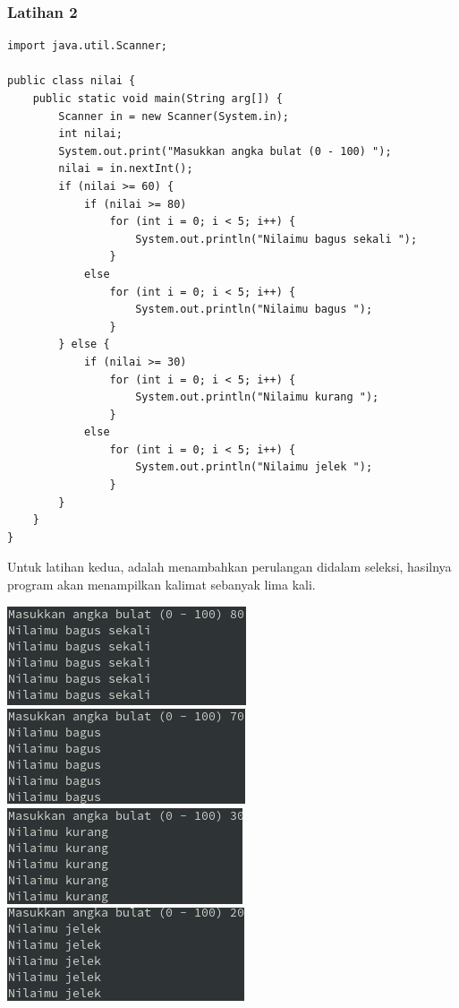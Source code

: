 \documentclass[a4paper,12pt]{article}
\begin{document}
\subsubsection{Latihan 2}
\begin{lstlisting}
import java.util.Scanner;

public class nilai {
    public static void main(String arg[]) {
        Scanner in = new Scanner(System.in);
        int nilai;
        System.out.print("Masukkan angka bulat (0 - 100) ");
        nilai = in.nextInt();
        if (nilai >= 60) {
            if (nilai >= 80)
                for (int i = 0; i < 5; i++) {
                    System.out.println("Nilaimu bagus sekali ");
                }
            else
                for (int i = 0; i < 5; i++) {
                    System.out.println("Nilaimu bagus ");
                }
        } else {
            if (nilai >= 30)
                for (int i = 0; i < 5; i++) {
                    System.out.println("Nilaimu kurang ");
                }
            else
                for (int i = 0; i < 5; i++) {
                    System.out.println("Nilaimu jelek ");
                }
        }
    }
}
\end{lstlisting}
Untuk latihan kedua, adalah menambahkan perulangan didalam seleksi, hasilnya program akan menampilkan kalimat sebanyak lima kali.
\begin{center}
    \includegraphics[scale=.8]{8.png}
    \includegraphics[scale=.8]{9.png}
    \includegraphics[scale=.8]{10.png}
    \includegraphics[scale=.8]{11.png}
\end{center}
\end{document}
